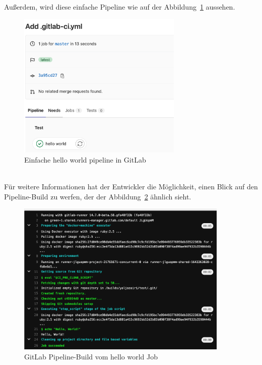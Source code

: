 \pagebreak
Außerdem, wird diese einfache Pipeline wie auf der Abbildung~\ref{fig:GitLabHelloWorldPipeline} aussehen.

\begin{figure}[!htbp]%
	\centering
	\includegraphics[width=0.7\textwidth]{Graphics/GitLab-helloWorld_pipeline.png}
	\caption{Einfache hello world pipeline in GitLab}
	\label{fig:GitLabHelloWorldPipeline}
\end{figure}
\ \\
Für weitere Informationen hat der Entwickler die Möglichkeit, einen Blick auf den Pipeline-Build zu werfen, der der Abbildung~\ref{fig:GitLabPipelineBuild} ähnlich sieht.

\pagebreak
\begin{figure}[!htbp]%
	\centering
	\includegraphics[width=0.9\textwidth]{Graphics/GitLab-pipeline-job-build.png}
	\caption{GitLab Pipeline-Build vom hello world Job}
	\label{fig:GitLabPipelineBuild}
\end{figure}

